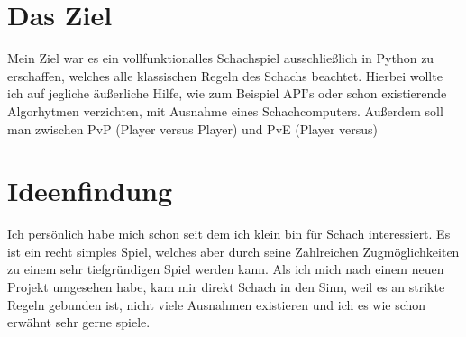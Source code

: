\documentclass[a4paper, 10pt]{scrartcl}
\begin{document}
\section{Das Ziel}
Mein Ziel war es ein vollfunktionalles Schachspiel ausschließlich in Python
zu erschaffen, welches alle klassischen Regeln des Schachs beachtet. 
Hierbei wollte ich auf jegliche äußerliche Hilfe, wie zum Beispiel API's oder schon
existierende Algorhytmen verzichten, mit Ausnahme eines Schachcomputers. 
Außerdem soll man zwischen PvP (Player versus Player) und PvE (Player versus)

\section{Ideenfindung}
Ich persönlich habe mich schon seit dem ich klein bin für Schach interessiert.
Es ist ein recht simples Spiel, welches aber durch seine Zahlreichen Zugmöglichkeiten zu einem sehr tiefgründigen Spiel werden kann.
Als ich mich nach einem neuen Projekt umgesehen habe, kam mir direkt Schach in den Sinn, weil es an strikte Regeln gebunden ist, nicht viele Ausnahmen existieren
und ich es wie schon erwähnt sehr gerne spiele.
\end{document}
